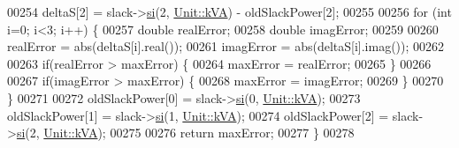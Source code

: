 \begin{DoxyCode}
00254   deltaS[2] = slack->\hyperlink{group___models_ga9af07eb85c2c76eb3bc73e25bb842c1e}{si}(2, \hyperlink{class_unit_ace265ae255370ccacfd5370337572c3ba72b181a842ae2759488a2fa1410d3696}{Unit::kVA}) - oldSlackPower[2];
00255 
00256   \textcolor{keywordflow}{for} (\textcolor{keywordtype}{int} i=0; i<3; i++) \{
00257     \textcolor{keywordtype}{double} realError;
00258     \textcolor{keywordtype}{double} imagError;
00259 
00260     realError = abs(deltaS[i].real());
00261     imagError = abs(deltaS[i].imag());
00262 
00263     \textcolor{keywordflow}{if}(realError > maxError) \{
00264       maxError = realError;
00265     \}
00266 
00267     \textcolor{keywordflow}{if}(imagError > maxError) \{
00268       maxError = imagError;
00269     \}
00270   \}
00271 
00272   oldSlackPower[0] = slack->\hyperlink{group___models_ga9af07eb85c2c76eb3bc73e25bb842c1e}{si}(0, \hyperlink{class_unit_ace265ae255370ccacfd5370337572c3ba72b181a842ae2759488a2fa1410d3696}{Unit::kVA});
00273   oldSlackPower[1] = slack->\hyperlink{group___models_ga9af07eb85c2c76eb3bc73e25bb842c1e}{si}(1, \hyperlink{class_unit_ace265ae255370ccacfd5370337572c3ba72b181a842ae2759488a2fa1410d3696}{Unit::kVA});
00274   oldSlackPower[2] = slack->\hyperlink{group___models_ga9af07eb85c2c76eb3bc73e25bb842c1e}{si}(2, \hyperlink{class_unit_ace265ae255370ccacfd5370337572c3ba72b181a842ae2759488a2fa1410d3696}{Unit::kVA});
00275 
00276   \textcolor{keywordflow}{return} maxError;
00277 \}
00278 
\end{DoxyCode}
